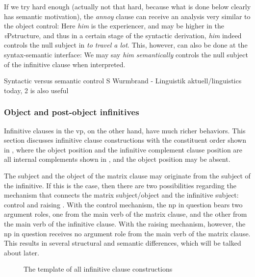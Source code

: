 \documentclass[UTF8, a4paper, oneside, scheme=plain, 12pt]{ctexbook}
\newcommand*{\citepages}[1]{pp.~{#1}}
\newcommand{\form}[1]{\emph{#1}}
\newcommand{\vP}{\textit{v}P}
\begin{document}
If we try hard enough
(actually not that hard, because what is done below clearly has semantic motivation), 
the \form{annoy} clause can receive an analysis very similar to the object control:
Here \form{him} is the experiencer, 
and may be higher in the \vP structure, 
and thus in a certain stage of the syntactic derivation,
\form{him} indeed controls the null subject in \form{to travel a lot}.
This, however, can also be done at the syntax-semantic interface: 
We may say \form{him} \emph{semantically} controls 
the null subject of the infinitive clause
when interpreted.

Syntactic versus semantic control
S Wurmbrand - Linguistik aktuell/linguistics today, 2 is also useful

\subsubsection{Object and post-object infinitives}

Infinitive clauses in the \acs{vp},
on the other hand, 
have much richer behaviors.
This section discusses infinitive clause constructions with the constituent order 
shown in ,
where the object position and the infinitive complement clause position 
are all internal complements shown in ,
and the object position may be absent.

The subject and the object of the matrix clause may originate from the subject of the infinitive.
If this is the case,
then there are two possibilities regarding the mechanism that connects the matrix subject/object 
and the infinitive subject:
control and raising \citet[\citepages{1194-1197}]{cgel}.
With the control mechanism,
the \acs{np} in question bears two argument roles,
one from the main verb of the matrix clause, and the other from the main verb of the infinitive clause.
With the raising mechanism, however,
the \acs{np} in question receives no argument role from the main verb of the matrix clause.
This results in several structural and semantic differences,
which will be talked about later.

\begin{figure}
    \centering
    {\small }
    \caption{The template of all infinitive clause constructions}
    \label{fig:complement.infinitive.template}
\end{figure}
\end{document}
